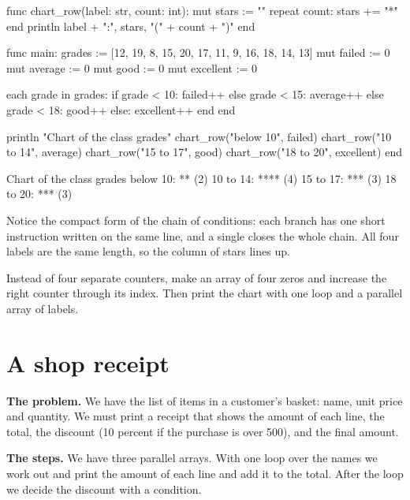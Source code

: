 \begin{salamcode}
func chart_row(label: str, count: int):
    mut stars := ""
    repeat count:
        stars += "*"
    end
    println label + ":", stars, "(" + count + ")"
end

func main:
    grades := [12, 19, 8, 15, 20, 17, 11, 9, 16, 18, 14, 13]
    mut failed := 0
    mut average := 0
    mut good := 0
    mut excellent := 0

    each grade in grades:
        if grade < 10: failed++
        else grade < 15: average++
        else grade < 18: good++
        else: excellent++
        end
    end

    println "Chart of the class grades"
    chart_row("below 10", failed)
    chart_row("10 to 14", average)
    chart_row("15 to 17", good)
    chart_row("18 to 20", excellent)
end
\end{salamcode}

\begin{salamout}
Chart of the class grades
below 10: ** (2)
10 to 14: **** (4)
15 to 17: *** (3)
18 to 20: *** (3)
\end{salamout}

Notice the compact form of the chain of conditions: each branch has one
short instruction written on the same line, and a single  closes
the whole chain. All four labels are the same length, so the column of
stars lines up.

\begin{tip}
Instead of four separate counters, make an array of four zeros and increase
the right counter through its index. Then print the chart with one
 loop and a parallel array of labels.
\end{tip}

\section{A shop receipt}

\textbf{The problem.} We have the list of items in a customer's basket:
name, unit price and quantity. We must print a receipt that shows the amount
of each line, the total, the discount (10 percent if the purchase is over
500), and the final amount.

\textbf{The steps.} We have three parallel arrays. With one loop over the
names we work out and print the amount of each line and add it to the
total. After the loop we decide the discount with a condition.

